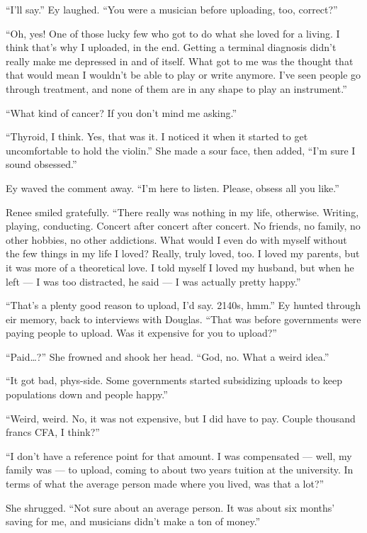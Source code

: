 ``I'll say.'' Ey laughed. ``You were a musician before uploading, too, correct?''

``Oh, yes! One of those lucky few who got to do what she loved for a living. I think that's why I uploaded, in the end. Getting a terminal diagnosis didn't really make me depressed in and of itself. What got to me was the thought that that would mean I wouldn't be able to play or write anymore. I've seen people go through treatment, and none of them are in any shape to play an instrument.''

``What kind of cancer? If you don't mind me asking.''

``Thyroid, I think. Yes, that was it. I noticed it when it started to get uncomfortable to hold the violin.'' She made a sour face, then added, ``I'm sure I sound obsessed.''

Ey waved the comment away. ``I'm here to listen. Please, obsess all you like.''

Renee smiled gratefully. ``There really was nothing in my life, otherwise. Writing, playing, conducting. Concert after concert after concert. No friends, no family, no other hobbies, no other addictions. What would I even do with myself without the few things in my life I loved? Really, truly loved, too. I loved my parents, but it was more of a theoretical love. I told myself I loved my husband, but when he left — I was too distracted, he said — I was actually pretty happy.''

``That's a plenty good reason to upload, I'd say. 2140s, hmm.'' Ey hunted through eir memory, back to interviews with Douglas. ``That was before governments were paying people to upload. Was it expensive for you to upload?''

``Paid\ldots?'' She frowned and shook her head. ``God, no. What a weird idea.''

``It got bad, phys-side. Some governments started subsidizing uploads to keep populations down and people happy.''

``Weird, weird. No, it was not expensive, but I did have to pay. Couple thousand francs CFA, I think?''

``I don't have a reference point for that amount. I was compensated — well, my family was — to upload, coming to about two years tuition at the university. In terms of what the average person made where you lived, was that a lot?''

She shrugged. ``Not sure about an average person. It was about six months' saving for me, and musicians didn't make a ton of money.''

